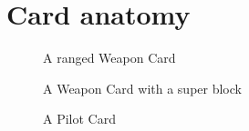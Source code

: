 \documentclass[a4paper, twocolumn]{article}
\begin{document}
\onecolumn
\section{Card anatomy}

\begin{figure}[!ht]
  \centering
  \resizebox{\textwidth}{!}{}
    \par A ranged Weapon Card
\end{figure}


\begin{figure}[!ht]
  \centering
    \resizebox{\textwidth}{!}{}
    \par A Weapon Card with a super block
\end{figure}

\begin{figure}[!ht]
    \centering
      \resizebox{\textwidth}{!}{}
    \par A Pilot Card
\end{figure}
\end{document}
